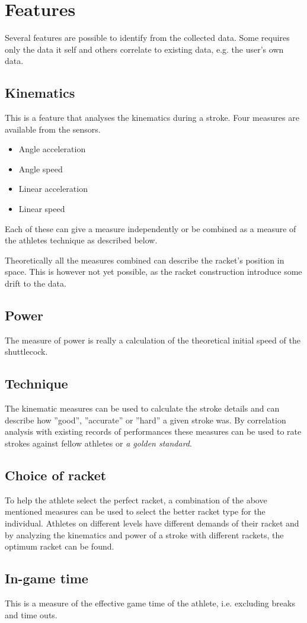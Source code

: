 
\section{Features}
Several features are possible to identify from the collected data.
Some requires only the data it self and others correlate to existing data, e.g. the user's own data.

\subsection*{Kinematics}
This is a feature that analyses the kinematics during a stroke.
Four measures are available from the sensors.

\begin{itemize}
    \item Angle acceleration
    \item Angle speed
    \item Linear acceleration
    \item Linear speed
\end{itemize}

Each of these can give a measure independently or be combined as a measure of the athletes technique as described below.

Theoretically all the measures combined can describe the racket's position in space.
This is however not yet possible, as the racket construction introduce some drift to the data.

\subsection*{Power}
The measure of power is really a calculation of the theoretical initial speed of the shuttlecock.

\subsection*{Technique}
The kinematic measures can be used to calculate the stroke details and can describe how ''good'', ''accurate'' or ''hard'' a given stroke was.
By correlation analysis with existing records of performances these measures can be used to rate strokes against fellow athletes or \textit{a golden standard}.

\subsection*{Choice of racket}
To help the athlete select the perfect racket, a combination of the above mentioned measures can be used to select the better racket type for the individual.
Athletes on different levels have different demands of their racket and by analyzing the kinematics and power of a stroke with different rackets, the optimum racket can be found.

\subsection*{In-game time}
This is a measure of the effective game time of the athlete, i.e. excluding breaks and time outs.
